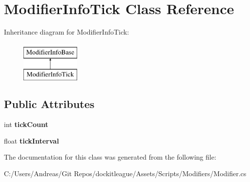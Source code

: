 \hypertarget{class_modifier_info_tick}{}\section{Modifier\+Info\+Tick Class Reference}
\label{class_modifier_info_tick}
Inheritance diagram for Modifier\+Info\+Tick\+:\begin{figure}[H]
\begin{center}
\leavevmode
\includegraphics[height=2.000000cm]{class_modifier_info_tick}
\end{center}
\end{figure}
\subsection*{Public Attributes}
\begin{DoxyCompactItemize}
\item 
\hypertarget{class_modifier_info_tick_ad95d25a88801b661fc40ad2cff3a6368}{}\label{class_modifier_info_tick_ad95d25a88801b661fc40ad2cff3a6368} 
int {\bfseries tick\+Count}
\item 
\hypertarget{class_modifier_info_tick_a3727aa4c7b163b863cedd7c5cf258194}{}\label{class_modifier_info_tick_a3727aa4c7b163b863cedd7c5cf258194} 
float {\bfseries tick\+Interval}
\end{DoxyCompactItemize}


The documentation for this class was generated from the following file\+:\begin{DoxyCompactItemize}
\item 
C\+:/\+Users/\+Andreas/\+Git Repos/dockitleague/\+Assets/\+Scripts/\+Modifiers/Modifier.\+cs\end{DoxyCompactItemize}
